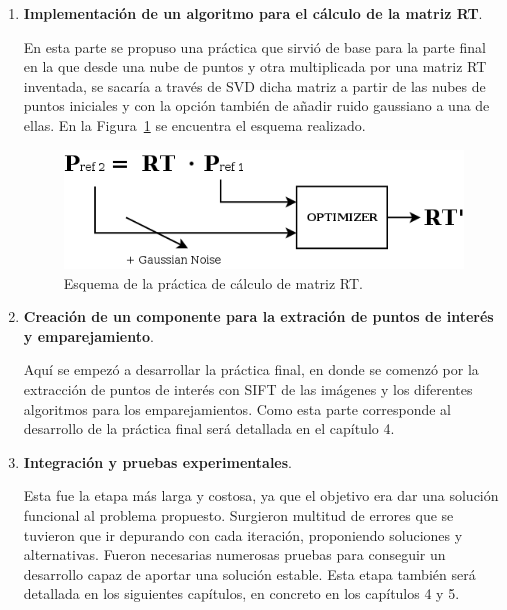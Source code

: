 \begin{enumerate}
\begin{itemize}
\end{itemize}

\item \textbf{Implementación de un algoritmo para el cálculo de la matriz RT}.

En esta parte se propuso una práctica que sirvió de base para la parte final en la que desde una nube de puntos y otra multiplicada por una matriz RT inventada, se sacaría a través de SVD dicha matriz a partir de las nubes de puntos iniciales y con la opción también de añadir ruido gaussiano a una de ellas. En la Figura~\ref{fig:rtsvd} se encuentra el esquema realizado.

\begin{figure}[th]
\centering
\includegraphics[scale=0.6]{Figures/rt_svd.png}
\decoRule
\caption[Rtsvd]{Esquema de la práctica de cálculo de matriz RT.}
\label{fig:rtsvd}
\end{figure}

\item \textbf{Creación de un componente para la extración de puntos de interés y emparejamiento}.

Aquí se empezó a desarrollar la práctica final, en donde se comenzó por la extracción de puntos de interés con SIFT de las imágenes y los diferentes algoritmos para los emparejamientos. Como esta parte corresponde al desarrollo de la práctica final será detallada en el capítulo 4.

\item \textbf{Integración y pruebas experimentales}.

Esta fue la etapa más larga y costosa, ya que el objetivo era dar una solución funcional al problema propuesto. Surgieron multitud de errores que se tuvieron que ir depurando con cada iteración, proponiendo soluciones y alternativas. Fueron necesarias numerosas pruebas para conseguir un desarrollo capaz de aportar una solución estable. Esta etapa también será detallada en los siguientes capítulos, en concreto en los capítulos 4 y 5.

\end{enumerate}